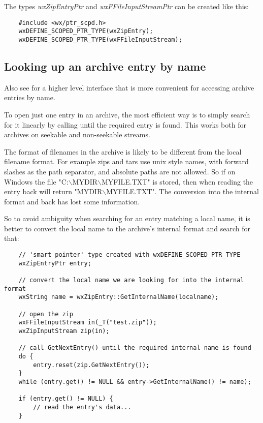 The  types {\em wxZipEntryPtr}
and {\em wxFFileInputStreamPtr} can be created like this:

\begin{verbatim}
    #include <wx/ptr_scpd.h>
    wxDEFINE_SCOPED_PTR_TYPE(wxZipEntry);
    wxDEFINE_SCOPED_PTR_TYPE(wxFFileInputStream);

\end{verbatim}


\subsection{Looking up an archive entry by name}\label{wxarcbyname}


Also see  for a higher level interface that is
more convenient for accessing archive entries by name.

To open just one entry in an archive, the most efficient way is
to simply search for it linearly by calling
  until the
required entry is found. This works both for archives on seekable and
non-seekable streams.

The format of filenames in the archive is likely to be different
from the local filename format. For example zips and tars use
unix style names, with forward slashes as the path separator,
and absolute paths are not allowed. So if on Windows the file
"C:$\backslash$MYDIR$\backslash$MYFILE.TXT" is stored, then when reading
the entry back  will return
"MYDIR$\backslash$MYFILE.TXT". The conversion into the internal format
and back has lost some information.

So to avoid ambiguity when searching for an entry matching a local name,
it is better to convert the local name to the archive's internal format
and search for that:

\begin{verbatim}
    // 'smart pointer' type created with wxDEFINE_SCOPED_PTR_TYPE
    wxZipEntryPtr entry;

    // convert the local name we are looking for into the internal format
    wxString name = wxZipEntry::GetInternalName(localname);

    // open the zip
    wxFFileInputStream in(_T("test.zip"));
    wxZipInputStream zip(in);

    // call GetNextEntry() until the required internal name is found
    do {
        entry.reset(zip.GetNextEntry());
    }
    while (entry.get() != NULL && entry->GetInternalName() != name);

    if (entry.get() != NULL) {
        // read the entry's data...
    }

\end{verbatim}

